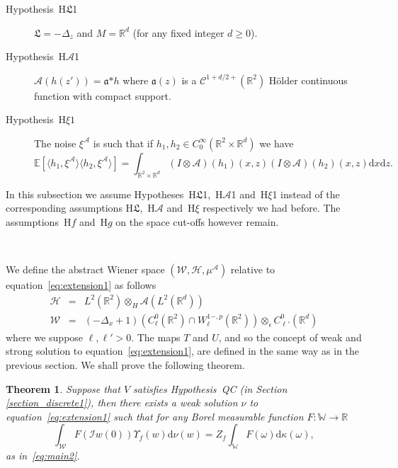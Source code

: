 \documentclass[a4paper,10pt]{article}
\newcommand{\asterisk}{\mathord{*}}
\newcommand{\mathd}{\mathrm{d}}
\newtheorem{theorem}{Theorem}
\newcommand{\descriptionparagraphs}[1]{\begin{description}#1\end{description}}
\begin{document}
{\descriptionparagraphs{
  \item[Hypothesis~H$\mathfrak{L}$1] $\mathfrak{L} = - \Delta_z$ and $M
  =\mathbb{R}^d$ (for any fixed integer $d \geqslant 0$).
  
  \item[Hypothesis~H$\mathcal{A}$1] $\mathcal{A} (h (z')) = \mathfrak{a}
  \asterisk h$ where $\mathfrak{a} (z)$ is a $\mathcal{C}^{1 + d / 2 +}
  (\mathbb{R}^2)$ H{\"o}lder continuous function with compact support.
  
  \item[Hypothesis~H$\xi 1$] The noise $\xi^{\mathcal{A}}$ is such that if
  $h_1, h_2 \in C^{\infty}_0 (\mathbb{R}^2 \times \mathbb{R}^d)$ we have
  \[ \mathbb{E} [\langle h_1, \xi^{\mathcal{A}} \rangle \langle h_2,
     \xi^{\mathcal{A}} \rangle] = \int_{\mathbb{R}^2 \times \mathbb{R}^d} (I
     \otimes \mathcal{A}) (h_1) (x, z) (I \otimes \mathcal{A}) (h_2) (x, z)
     \mathd x \mathd z. \] 
}}

In this subsection we assume Hypotheses~H$\mathfrak{L}$1,~H$\mathcal{A}$1
and~H$\xi$1 instead of the corresponding assumptions
H$\mathfrak{L}$,~H$\mathcal{A}$ and~H$\xi$ respectively we had before. The
assumptions~H$f$ and~H$g$ on the space cut-offs however remain.

\

We define the abstract Wiener space $(\mathcal{W}, \mathcal{H},
\mu^{\mathcal{A}})$ relative to equation~{\eqref{eq:extension1}} as follows
\begin{eqnarray}
  \mathcal{H} & = & L^2 (\mathbb{R}^2) \otimes_H \mathcal{A} (L^2
  (\mathbb{R}^d)) \nonumber\\
  \mathcal{W} & = & (- \Delta_x + 1) (C^0_{\ell} (\mathbb{R}^2) \cap W^{1 -,
  p}_{\ell} (\mathbb{R}^2)) \otimes_{\epsilon} C^0_{\ell'} (\mathbb{R}^d)
  \nonumber
\end{eqnarray}
where we suppose $\ell, \ell' > 0$. The maps $T$ and $U$, and so the concept
of weak and strong solution to equation~{\eqref{eq:extension1}}, are defined
in the same way as in the previous section. We shall prove the following
theorem.

\begin{theorem}
  \label{theorem_extension1}Suppose that $V$ satisfies Hypothesis~QC (in
  Section \ref{section_discrete1}), then there exists a weak solution $\nu$ to
  equation~{\eqref{eq:extension1}} such that for any Borel measurable function
  $F : \mathbb{W} \rightarrow \mathbb{R}$
  \[ \int_{\mathcal{W}} F (\mathcal{} \mathcal{I} w (0)) \Upsilon_f (w) \mathd
     \nu (w) = Z_f \int_{\mathbb{W}} F (\omega) \mathd \kappa (\omega), \]
  as in~{\eqref{eq:main2}}.
\end{theorem}
\end{document}
